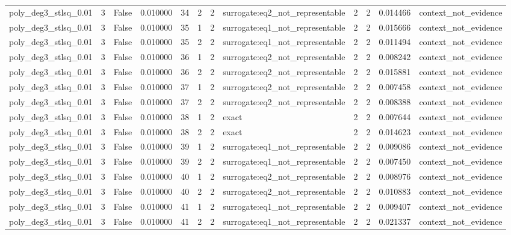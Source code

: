 \begin{tabular}{lrrrrrrlrrrl}
poly\_deg3\_stlsq\_0.01 & 3 & False & 0.010000 & 34 & 2 & 2 & surrogate:eq2\_not\_representable & 2 & 2 & 0.014466 & context\_not\_evidence \\
poly\_deg3\_stlsq\_0.01 & 3 & False & 0.010000 & 35 & 1 & 2 & surrogate:eq1\_not\_representable & 2 & 2 & 0.015666 & context\_not\_evidence \\
poly\_deg3\_stlsq\_0.01 & 3 & False & 0.010000 & 35 & 2 & 2 & surrogate:eq1\_not\_representable & 2 & 2 & 0.011494 & context\_not\_evidence \\
poly\_deg3\_stlsq\_0.01 & 3 & False & 0.010000 & 36 & 1 & 2 & surrogate:eq2\_not\_representable & 2 & 2 & 0.008242 & context\_not\_evidence \\
poly\_deg3\_stlsq\_0.01 & 3 & False & 0.010000 & 36 & 2 & 2 & surrogate:eq2\_not\_representable & 2 & 2 & 0.015881 & context\_not\_evidence \\
poly\_deg3\_stlsq\_0.01 & 3 & False & 0.010000 & 37 & 1 & 2 & surrogate:eq2\_not\_representable & 2 & 2 & 0.007458 & context\_not\_evidence \\
poly\_deg3\_stlsq\_0.01 & 3 & False & 0.010000 & 37 & 2 & 2 & surrogate:eq2\_not\_representable & 2 & 2 & 0.008388 & context\_not\_evidence \\
poly\_deg3\_stlsq\_0.01 & 3 & False & 0.010000 & 38 & 1 & 2 & exact & 2 & 2 & 0.007644 & context\_not\_evidence \\
poly\_deg3\_stlsq\_0.01 & 3 & False & 0.010000 & 38 & 2 & 2 & exact & 2 & 2 & 0.014623 & context\_not\_evidence \\
poly\_deg3\_stlsq\_0.01 & 3 & False & 0.010000 & 39 & 1 & 2 & surrogate:eq1\_not\_representable & 2 & 2 & 0.009086 & context\_not\_evidence \\
poly\_deg3\_stlsq\_0.01 & 3 & False & 0.010000 & 39 & 2 & 2 & surrogate:eq1\_not\_representable & 2 & 2 & 0.007450 & context\_not\_evidence \\
poly\_deg3\_stlsq\_0.01 & 3 & False & 0.010000 & 40 & 1 & 2 & surrogate:eq2\_not\_representable & 2 & 2 & 0.008976 & context\_not\_evidence \\
poly\_deg3\_stlsq\_0.01 & 3 & False & 0.010000 & 40 & 2 & 2 & surrogate:eq2\_not\_representable & 2 & 2 & 0.010883 & context\_not\_evidence \\
poly\_deg3\_stlsq\_0.01 & 3 & False & 0.010000 & 41 & 1 & 2 & surrogate:eq1\_not\_representable & 2 & 2 & 0.009407 & context\_not\_evidence \\
poly\_deg3\_stlsq\_0.01 & 3 & False & 0.010000 & 41 & 2 & 2 & surrogate:eq1\_not\_representable & 2 & 2 & 0.021337 & context\_not\_evidence \\

\end{tabular}
